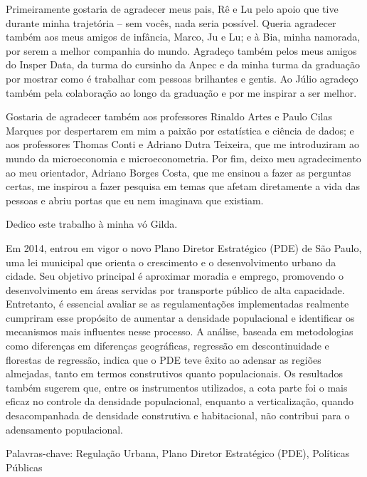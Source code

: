 \documentclass[
  a4paper, 
  12pt, 
  openany, 
  oneside, 
  brazil,
]{abntex2}
\begin{document}
\begin{agradecimentos}



Primeiramente gostaria de agradecer meus pais, Rê e Lu pelo apoio que tive durante minha trajetória -- sem vocês, nada seria possível. Queria agradecer também aos meus amigos de infância, Marco, Ju e Lu; e à Bia, minha namorada, por serem a melhor companhia do mundo. Agradeço também pelos meus amigos do Insper Data, da turma do cursinho da Anpec e da minha turma da graduação por mostrar como é trabalhar com pessoas brilhantes e gentis. Ao Júlio agradeço também pela colaboração ao longo da graduação e por me inspirar a ser melhor.  

Gostaria de agradecer também aos professores Rinaldo Artes e Paulo Cilas Marques por despertarem em mim a paixão por estatística e ciência de dados; e aos professores Thomas Conti e Adriano Dutra Teixeira, que me introduziram ao mundo da microeconomia e microeconometria. Por fim, deixo meu agradecimento ao meu orientador, Adriano Borges Costa, que me ensinou a fazer as perguntas certas, me inspirou a fazer pesquisa em temas que afetam diretamente a vida das pessoas e abriu portas que eu nem imaginava que existiam. 

\bigskip
\raggedleft Dedico este trabalho à minha vó Gilda.

\end{agradecimentos}


\setlength{\absparsep}{18pt} %
\begin{resumo}

Em 2014, entrou em vigor o novo Plano Diretor Estratégico (PDE) de São Paulo, uma lei municipal que orienta o crescimento e o desenvolvimento urbano da cidade. Seu objetivo principal é aproximar moradia e emprego, promovendo o desenvolvimento em áreas servidas por transporte público de alta capacidade. Entretanto, é essencial avaliar se as regulamentações implementadas realmente cumpriram esse propósito de aumentar a densidade populacional e identificar os mecanismos mais influentes nesse processo. A análise, baseada em metodologias como diferenças em diferenças geográficas, regressão em descontinuidade e florestas de regressão, indica que o PDE teve êxito ao adensar as regiões almejadas, tanto em termos construtivos quanto populacionais. Os resultados também sugerem que, entre os instrumentos utilizados, a cota parte foi o mais eficaz no controle da densidade populacional, enquanto a verticalização, quando desacompanhada de densidade construtiva e habitacional, não contribui para o adensamento populacional.

Palavras-chave: Regulação Urbana, Plano Diretor Estratégico (PDE), Políticas Públicas

\end{resumo}
\end{document}
